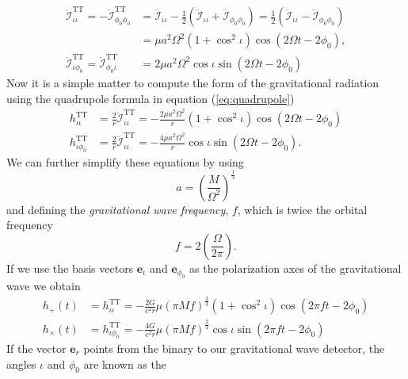 \begin{equation}
\begin{split}
\ddot{\mathcal{I}}_{\iota\iota}^\mathrm{TT} = - \ddot{\mathcal{I}}_{\phi_0\phi_0}^\mathrm{TT} &= 
\ddot{\mathcal{I}}_{\iota\iota} - \frac{1}{2}
\left( \ddot{\mathcal{I}}_{\iota\iota} + 
\ddot{\mathcal{I}}_{\phi_0\phi_0} \right) = 
\frac{1}{2} \left(  \ddot{\mathcal{I}}_{\iota\iota} - 
\ddot{\mathcal{I}}_{\phi_0\phi_0}
\right) \\
&= \mu a^2\Omega^2 \left(1 + \cos^2\iota\right) \cos\left(2\Omega t - 2\phi_0\right) ,\\
\ddot{\mathcal{I}}_{\iota\phi_0}^\mathrm{TT} = \ddot{\mathcal{I}}_{\phi_0\iota}^\mathrm{TT}  &=
2\mu a^2 \Omega^2 \cos\iota \sin(2\Omega t - 2\phi_0)
\end{split}
\end{equation}
Now it is a simple matter to compute the form of the gravitational
radiation using the quadrupole formula in equation (\ref{eq:quadrupole})
\begin{align}
h_{\iota\iota}^\mathrm{TT} &= 
\frac{2}{r} \ddot{\mathcal{I}}_{\iota\iota}^\mathrm{TT} =
-\frac{2\mu a^2\Omega^2}{r} (1 + \cos^2\iota) \cos\left(2\Omega t - 2\phi_0\right) \\
h_{\iota\phi_0}^\mathrm{TT} &= 
\frac{2}{r} \ddot{\mathcal{I}}_{\iota\iota}^\mathrm{TT} =
-\frac{4 \mu a^2 \Omega^2}{r} \cos\iota \sin\left(2\Omega t - 2\phi_0\right).
\end{align}
We can further simplify these equations by using
\begin{equation}
a = \left(\frac{M}{\Omega^2}\right)^\frac{1}{3}
\end{equation}
and defining the \emph{gravitational wave frequency}, $f$, which is twice the
orbital frequency 
\begin{equation}
f  = 2\left(\frac{\Omega}{2\pi}\right).
\end{equation}
If we use the basis vectors $\boldsymbol{e}_{\iota}$ and
$\boldsymbol{e}_{\phi_0}$ as the polarization axes of the gravitational wave
we obtain
\begin{align}
h_{+}(t) &= h_{\iota\iota}^\mathrm{TT} = - \frac{2G}{c^2 r} \mu (\pi M
f)^\frac{2}{3} (1 + \cos^2 \iota ) \cos(2\pi f t - 2 \phi_0) \\
h_{\times}(t) &= h_{\iota\phi_0}^\mathrm{TT} = - \frac{4G}{c^2 r} \mu (\pi M
f)^\frac{2}{3} \cos\iota \sin(2\pi f t - 2 \phi_0)
\end{align}
If the vector $\boldsymbol{e}_r$ points from the binary to our gravitational
wave detector, the angles $\iota$ and $\phi_0$ are known as the
